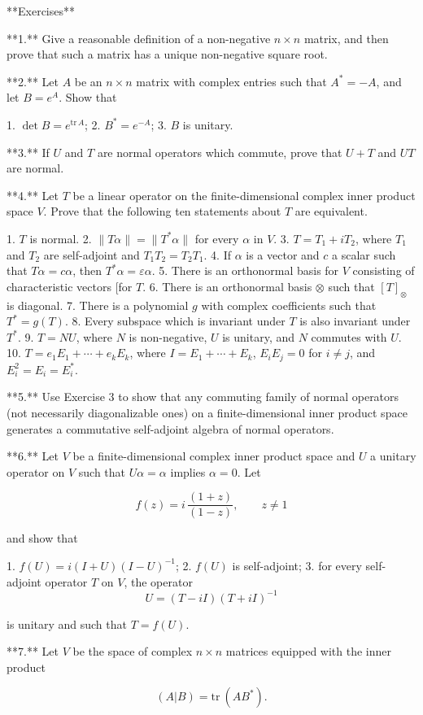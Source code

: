 

**Exercises**

**1.** Give a reasonable definition of a non-negative \(n\times n\) matrix, and then prove that such a matrix has a unique non-negative square root.

**2.** Let \(A\) be an \(n\times n\) matrix with complex entries such that \(A^{*}=-A\), and let \(B=e^{A}\). Show that

1. \(\det B=e^{\mathrm{tr}\,A}\);
2. \(B^{*}=e^{-A}\);
3. \(B\) is unitary.

**3.** If \(U\) and \(T\) are normal operators which commute, prove that \(U+T\) and \(UT\) are normal.

**4.** Let \(T\) be a linear operator on the finite-dimensional complex inner product space \(V\). Prove that the following ten statements about \(T\) are equivalent.

1. \(T\) is normal.
2. \(\|T\alpha\|=\|T^{*}\alpha\|\) for every \(\alpha\) in \(V\).
3. \(T=T_{1}+iT_{2}\), where \(T_{1}\) and \(T_{2}\) are self-adjoint and \(T_{1}T_{2}=T_{2}T_{1}\).
4. If \(\alpha\) is a vector and \(c\) a scalar such that \(T\alpha=c\alpha\), then \(T^{*}\alpha=\varepsilon\alpha\).
5. There is an orthonormal basis for \(V\) consisting of characteristic vectors [for \(T\).
6. There is an orthonormal basis \(\otimes\) such that \([T]_{\otimes}\) is diagonal.
7. There is a polynomial \(g\) with complex coefficients such that \(T^{*}=g(T)\).
8. Every subspace which is invariant under \(T\) is also invariant under \(T^{*}\).
9. \(T=NU\), where \(N\) is non-negative, \(U\) is unitary, and \(N\) commutes with \(U\).
10. \(T=e_{1}E_{1}+\cdots+e_{k}E_{k}\), where \(I=E_{1}+\cdots+E_{k}\), \(E_{i}E_{j}=0\) for \(i\neq j\), and \(E_{i}^{2}=E_{i}=E_{i}^{*}\).

**5.** Use Exercise 3 to show that any commuting family of normal operators (not necessarily diagonalizable ones) on a finite-dimensional inner product space generates a commutative self-adjoint algebra of normal operators.

**6.** Let \(V\) be a finite-dimensional complex inner product space and \(U\) a unitary operator on \(V\) such that \(U\alpha=\alpha\) implies \(\alpha=0\). Let

\[f(z)=i\,\frac{(1+z)}{(1-z)},\qquad z\neq 1\]

and show that

1. \(f(U)=i(I+U)(I-U)^{-1}\);
2. \(f(U)\) is self-adjoint;
3. for every self-adjoint operator \(T\) on \(V\), the operator \[U=(T-iI)(T+iI)^{-1}\]

is unitary and such that \(T=f(U)\).

**7.** Let \(V\) be the space of complex \(n\times n\) matrices equipped with the inner product

\[(A|B)=\mathrm{tr}\ (AB^{*}).\]